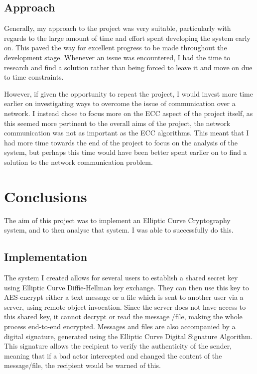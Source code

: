 \documentclass[12pt,a4paper]{article}
\begin{document}
\subsection{Approach} \noindent \label{Approach}
Generally, my approach to the project was very suitable, particularly with regards to the large amount of time and effort spent developing the system early on. 
This paved the way for excellent progress to be made throughout the development stage. 
Whenever an issue was encountered, I had the time to research and find a solution rather than being forced to leave it and move on due to time constraints. 

However, if given the opportunity to repeat the project, I would invest more time earlier on investigating ways to overcome the issue of communication over a network. 
I instead chose to focus more on the ECC aspect of the project itself, as this seemed more pertinent to the overall aims of the project, the network communication was not as important as the ECC algorithms. 
This meant that I had more time towards the end of the project to focus on the analysis of the system, 
but perhaps this time would have been better spent earlier on to find a solution to the network communication problem. 



\section{Conclusions} \noindent
The aim of this project was to implement an Elliptic Curve Cryptography system, 
and to then analyse that system. 
I was able to successfully do this. 

\subsection{Implementation} \noindent
The system I created allows for several users to establish a shared secret key using Elliptic Curve Diffie-Hellman key exchange. 
They can then use this key to AES-encrypt either a text message or a file which is sent to another user via a server, using remote object invocation. 
Since the server does not have access to this shared key, it cannot decrypt or read the message /file, making the whole process end-to-end encrypted. 
Messages and files are also accompanied by a digital signature, generated using the Elliptic Curve Digital Signature Algorithm. 
This signature allows the recipient to verify the authenticity of the sender, meaning that if a bad actor intercepted and changed the content of the message/file, the recipient would be warned of this. 
\end{document}
